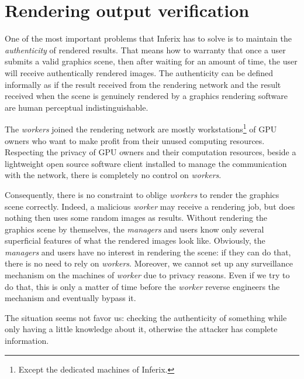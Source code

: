 \section[Rendering output verification]{Rendering output verification}\label{sec:output_verification}
One of the most important problems that Inferix has to solve is to maintain the \emph{authenticity} of rendered results. That means how to warranty that once a user submits a valid graphics scene, then after waiting for an amount of time, the user will receive authentically rendered images. The authenticity can be defined informally as if the result received from the rendering network and the result received when the scene is genuinely rendered by a graphics rendering software are human perceptual indistinguishable.

The \emph{workers} joined the rendering network are mostly workstations\footnote{Except the dedicated machines of Inferix.} of GPU owners who want to make profit from their unused computing resources. Respecting the privacy of GPU owners and their computation resources, beside a lightweight open source software client installed to manage the communication with the network, there is completely no control on \emph{workers}.

Consequently, there is no constraint to oblige \emph{workers} to render the graphics scene correctly. Indeed, a malicious \emph{worker} may receive a rendering job, but does nothing then uses some random images as results. Without rendering the graphics scene by themselves, the \emph{managers} and users know only several superficial features of what the rendered images look like. Obviously, the \emph{managers} and users have no interest in rendering the scene: if they can do that, there is no need to rely on \emph{workers}. Moreover, we cannot set up any surveillance mechanism on the machines of \emph{worker} due to privacy reasons. Even if we try to do that, this is only a matter of time before the \emph{worker} reverse engineers the mechanism and eventually bypass it.

The situation seems not favor us: checking the authenticity of something while only having a little knowledge about it, otherwise the attacker has complete information.






